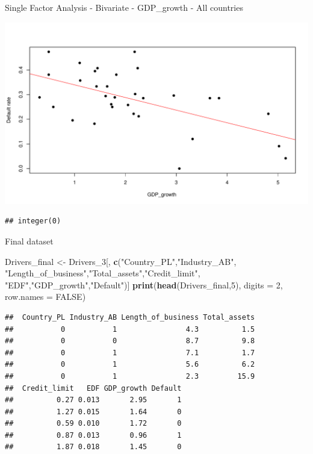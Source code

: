 \documentclass[9pt,ignorenonframetext,]{beamer}
\newenvironment{Shaded}{\begin{snugshade}}{\end{snugshade}}
\newcommand{\KeywordTok}[1]{\textcolor[rgb]{0.13,0.29,0.53}{\textbf{#1}}}
\newcommand{\DataTypeTok}[1]{\textcolor[rgb]{0.13,0.29,0.53}{#1}}
\newcommand{\DecValTok}[1]{\textcolor[rgb]{0.00,0.00,0.81}{#1}}
\newcommand{\StringTok}[1]{\textcolor[rgb]{0.31,0.60,0.02}{#1}}
\newcommand{\OtherTok}[1]{\textcolor[rgb]{0.56,0.35,0.01}{#1}}
\newcommand{\NormalTok}[1]{#1}
\begin{document}
\begin{frame}[fragile]{Single Factor Analysis - Bivariate - GDP\_growth
- All countries}

\includegraphics{Risk-Models-Development-Process_files/figure-beamer/unnamed-chunk-44-1.pdf}

\begin{verbatim}
## integer(0)
\end{verbatim}

\end{frame}

\begin{frame}[fragile]{Final dataset}

\begin{Shaded}
\begin{Highlighting}[]
\NormalTok{Drivers_final <-}\StringTok{ }\NormalTok{Drivers_}\DecValTok{3}\NormalTok{[, }\KeywordTok{c}\NormalTok{(}\StringTok{"Country_PL"}\NormalTok{,}\StringTok{"Industry_AB"}\NormalTok{,}
                \StringTok{"Length_of_business"}\NormalTok{,}\StringTok{"Total_assets"}\NormalTok{,}\StringTok{"Credit_limit"}\NormalTok{,}
                \StringTok{"EDF"}\NormalTok{,}\StringTok{"GDP_growth"}\NormalTok{,}\StringTok{"Default"}\NormalTok{)]}
\KeywordTok{print}\NormalTok{(}\KeywordTok{head}\NormalTok{(Drivers_final,}\DecValTok{5}\NormalTok{), }\DataTypeTok{digits =} \DecValTok{2}\NormalTok{, }\DataTypeTok{row.names =} \OtherTok{FALSE}\NormalTok{)}
\end{Highlighting}
\end{Shaded}

\begin{verbatim}
##  Country_PL Industry_AB Length_of_business Total_assets
##           0           1                4.3          1.5
##           0           0                8.7          9.8
##           0           1                7.1          1.7
##           0           1                5.6          6.2
##           0           1                2.3         15.9
##  Credit_limit   EDF GDP_growth Default
##          0.27 0.013       2.95       1
##          1.27 0.015       1.64       0
##          0.59 0.010       1.72       0
##          0.87 0.013       0.96       1
##          1.87 0.018       1.45       0
\end{verbatim}

\end{frame}
\end{document}
